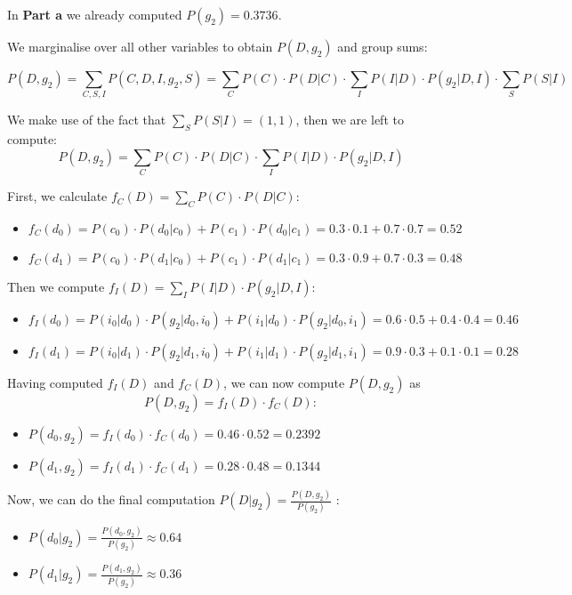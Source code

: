 \documentclass[11pt,a4paper]{article}
\begin{document}
	In \textbf{Part a} we already computed $P(g_2) = 0.3736. $
	
	We marginalise over all other variables to obtain $P(D , g_2)$ and group sums:
	
	$$ P(D, g_2) = \sum_{C,S,I}P(C,D,I, g_2,S) = \sum_{C}P(C)\cdot P(D|C)\cdot \sum_{I}P(I|D) \cdot P(g_2|D,I) \cdot \sum_{S}P(S|I)$$
	
	We make use of the fact that $ \sum_{S}P(S|I) = (1, 1)$, then we are left to compute:
	$$ P(D,g_2)  = \sum_{C}P(C)\cdot P(D|C)\cdot \sum_{I}P(I|D) \cdot P(g_2|D,I)$$
	
	
	First, we calculate $ f_C(D) = \sum_{C}P(C) \cdot P(D|C): $
	\begin{itemize}
		\item $f_C(d_0) = P(c_0) \cdot P(d_0|c_0) + P(c_1) \cdot P(d_0|c_1) = 0.3 \cdot 0.1+0.7 \cdot 0.7 = 0.52$
		\item $f_C(d_1) = P(c_0) \cdot P(d_1|c_0) + P(c_1) \cdot P(d_1|c_1) = 0.3 \cdot 0.9 + 0.7 \cdot 0.3 = 0.48$
	\end{itemize}

	Then we compute $f_I(D) =  \sum_{I}P(I|D)\cdot P(g_2|D,I): $
	\begin{itemize}
		\item $f_I(d_0) = P(i_0|d_0) \cdot P(g_2|d_0,i_0) + P(i_1|d_0) \cdot P(g_2|d_0,i_1) = 0.6 \cdot 0.5 + 0.4 \cdot 0.4 = 0.46$
		\item $f_I(d_1) = P(i_0|d_1) \cdot P(g_2|d_1,i_0) + P(i_1|d_1) \cdot P(g_2|d_1,i_1)  = 0.9 \cdot 0.3 + 0.1 \cdot 0.1 = 0.28$
	\end{itemize} 
	
	Having computed $f_I(D)$ and $f_C(D)$, we can now compute $P(D,g_2)$ as $$P(D,g_2) = f_I(D) \cdot f_C(D): $$
	
	\begin{itemize}
		\item $P(d_0,g_2) = f_I(d_0) \cdot f_C(d_0) = 0.46  \cdot 0.52 = 0.2392 $
		\item $P(d_1,g_2) = f_I(d_1) \cdot f_C(d_1)  = 0.28  \cdot 0.48 = 0.1344 $
	\end{itemize}
	
	Now, we can do the final computation $ P(D | g_2) = \frac{P(D, g_2)}{P(g_2)} $ :
	\begin{itemize}
		\item $P(d_0|g_2) = \frac{P(d_0,g_2)}{P(g_2)} \approx 0.64 $
		\item $P(d_1|g_2) = \frac{P(d_1,g_2)}{P(g_2)} \approx 0.36 $
	\end{itemize}
	
\end{document}

